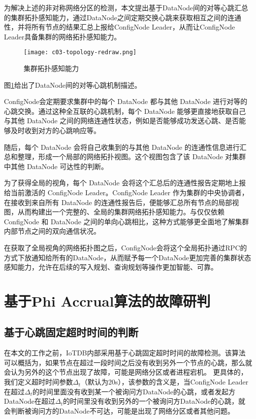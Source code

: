 为解决上述的非对称网络分区的检测，本文提出基于DataNode间的对等心跳汇总的集群拓扑感知能力，通过DataNode之间定期交换心跳来获取相互之间的连通性，并将所有节点的结果汇总上报给ConfigNode Leader，从而让ConfigNode Leader具备集群的网络拓扑感知能力。

\begin{figure}
  \centering
  \texttt{[image: c03-topology-redraw.png]}
  \caption{集群拓扑感知能力}
  \label{fig:c03-topology}
\end{figure}

图\ref{fig:c03-topology}给出了DataNode间的对等心跳机制描述。

ConfigNode会定期要求集群中的每个 DataNode 都与其他 DataNode 进行对等的心跳交换。通过这种全互联的心跳机制，每个 DataNode 能够更直接地获取自己与其他 DataNode 之间的网络连通性状态，例如是否能够成功发送心跳、是否能够及时收到对方的心跳响应等。

随后，每个 DataNode 会将自己收集到的与其他 DataNode 的连通性信息进行汇总和整理，形成一个局部的网络拓扑视图。这个视图包含了该 DataNode 对集群中其他 DataNode 可达性的判断。

为了获得全局的视角，每个 DataNode 会将这个汇总后的连通性报告定期地上报给当前激活的 ConfigNode Leader。ConfigNode Leader 作为集群的中央协调者，在接收到来自所有 DataNode 的连通性报告后，便能够汇总所有节点的局部视图，从而构建出一个完整的、全局的集群网络拓扑感知能力。与仅仅依赖 ConfigNode 和 DataNode 之间的单向心跳相比，这种方式能够更全面地了解集群内部节点之间的双向通信状况。

在获取了全局视角的网络拓扑图之后，ConfigNode会将这个全局拓扑通过RPC的方式下放通知给所有的DataNode，从而赋予每一个DataNode更加完善的集群状态感知能力，允许在后续的写入规划、查询规划等操作更加智能、可靠。


\section{基于Phi Accrual算法的故障研判}\label{failure_detection}

\subsection{基于心跳固定超时时间的判断}\label{failure_detection_timeout_fix}

在本文的工作之前，IoTDB内部采用基于心跳固定超时时间的故障检测。该算法可以概括为，如果节点在超过一段时间之后没有收到另外一个节点的心跳，那么就会认为另外的这个节点出现了故障，可能是网络分区或者进程宕机。
更具体的，我们定义超时时间参数$\Delta_{t}$（默认为20s），该参数的含义是，当ConfigNode Leader在超过$\Delta_{t}$的时间里面没有收到某一个被询问方DataNode的心跳，或者发起方DataNode在超过$\Delta_{t}$的时间里没有收到另外的一个被询问方DataNode的心跳，就会判断被询问方的DataNode不可达，可能是出现了网络分区或者其他问题。

